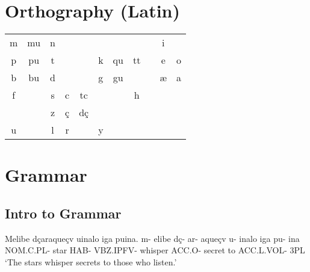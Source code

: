 \documentclass[12pt]{article}
\begin{document}
\section{Orthography (Latin)}
\begin{table}[H]
\begin{tabular}{clcllllllll}
m                    & \multicolumn{1}{c}{mu} & n &                       &                        &                       &                        &                        &  & \multicolumn{1}{c}{i} & \multicolumn{1}{c}{}  \\
p                    & \multicolumn{1}{c}{pu} & t &                       &                        & \multicolumn{1}{c}{k} & \multicolumn{1}{c}{qu} & \multicolumn{1}{c}{tt} &  & \multicolumn{1}{c}{e} & \multicolumn{1}{c}{o} \\
b                    & \multicolumn{1}{c}{bu} & d &                       &                        & \multicolumn{1}{c}{g} & \multicolumn{1}{c}{gu} &                        &  & \multicolumn{1}{c}{æ} & \multicolumn{1}{c}{a} \\
f                    &                        & s & \multicolumn{1}{c}{c} & \multicolumn{1}{c}{tc} &                       &                        & \multicolumn{1}{c}{h}  &  &                       &                       \\
\multicolumn{1}{l}{} &                        & z & \multicolumn{1}{c}{ç} & \multicolumn{1}{c}{dç} &                       &                        &                        &  &                       &                       \\
u                    &                        & l & \multicolumn{1}{c}{r} &                        & \multicolumn{1}{c}{y} &                        &                        &  &                       &                      
\end{tabular}
\end{table}


\newpage
\section{Grammar}

\subsection{Intro to Grammar}
\begin{exe}
\ex \label{ex:whisper1}
Melibe dçaraqueçv uinalo iga puina.
\gll
m-        elibe dç-  ar-     aqueçv  u-     inalo  iga pu-        ina\\
NOM.C.PL- star  HAB- VBZ.IPFV- whisper ACC.O- secret to  ACC.L.VOL- 3PL\\
\trans `The stars whisper secrets to those who listen.'\\
\end{exe}
\end{document}
